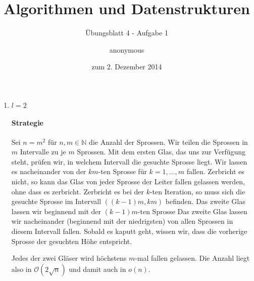 \documentclass[a4paper]{scrartcl}
\title{Algorithmen und Datenstrukturen}
\subtitle{Übungsblatt 4 - Aufgabe 1}
\author{
    anonymous
}
\date{zum 2. Dezember 2014}
\begin{document}
\maketitle

\begin{enumerate}
    \item $l=2$
        \paragraph{Strategie}
        Sei $n = m^2$ für $n, m \in \mathbb{N}$ die Anzahl der Sprossen.
        Wir teilen die Sprossen in $m$ Intervalle zu je $m$ Sprossen.
        Mit dem ersten Glas, das uns zur Verfügung steht, prüfen wir, in
        welchem Intervall die gesuchte Sprosse liegt.
        Wir lassen es nacheinander von der $km$-ten Sprosse für
        $k = 1, \ldots, m$ fallen.
        Zerbricht es nicht, so kann das Glas von jeder Sprosse der Leiter
        fallen gelassen werden, ohne dass es zerbricht.
        Zerbricht es bei der $k$-ten Iteration, so muss sich die gesuchte
        Sprosse im Intervall $\left( (k-1)m, km \right)$ befinden.
        Das zweite Glas lassen wir beginnend mit der $(k-1)m$-ten Sprosse
        Das zweite Glas lassen wir nacheinander (beginnend mit der niedrigsten)
        von allen Sprossen in diesem Intervall fallen.
        Sobald es kaputt geht, wissen wir, dass die vorherige Sprosse der
        gesuchten Höhe entspricht.

        Jedes der zwei Gläser wird höchstens $m$-mal fallen gelassen.
        Die Anzahl liegt also in $\mathcal{O}(2\sqrt{n})$ und damit auch in
        $o(n)$.






\end{enumerate}
\end{document}
